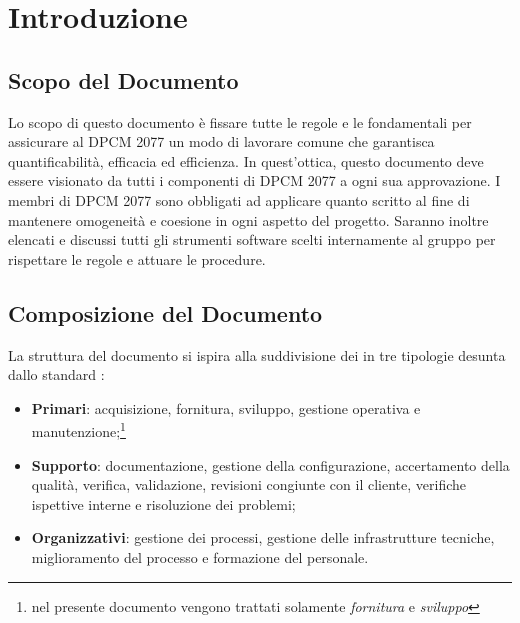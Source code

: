 \section{Introduzione}

\subsection{Scopo del Documento}
Lo scopo di questo documento è fissare tutte le  regole e le  fondamentali per assicurare al  DPCM 2077 un modo di lavorare comune che garantisca quantificabilità, efficacia ed efficienza.
In quest’ottica, questo documento deve essere visionato da tutti i componenti di DPCM 2077 a ogni sua approvazione. 
I membri di DPCM 2077 sono obbligati ad applicare quanto scritto al fine di mantenere omogeneità e coesione in ogni aspetto del progetto. Saranno inoltre elencati e discussi tutti gli   
strumenti software scelti internamente al gruppo per rispettare le regole e attuare le procedure.

\subsection{Composizione del Documento}
La struttura del documento si ispira alla suddivisione dei  in tre tipologie desunta dallo standard :
\begin{itemize}
\item{\textbf{Primari}: acquisizione, fornitura, sviluppo, gestione operativa e manutenzione;\footnote{nel presente documento vengono trattati solamente \textit{fornitura} e \textit{sviluppo}}}
\item{\textbf{Supporto}: documentazione, gestione della configurazione, accertamento della qualità, verifica, validazione, revisioni congiunte con il cliente, verifiche ispettive interne e risoluzione dei problemi;}
\item{\textbf{Organizzativi}: gestione dei processi, gestione delle infrastrutture tecniche, miglioramento del processo e formazione del personale.}
\end{itemize}
